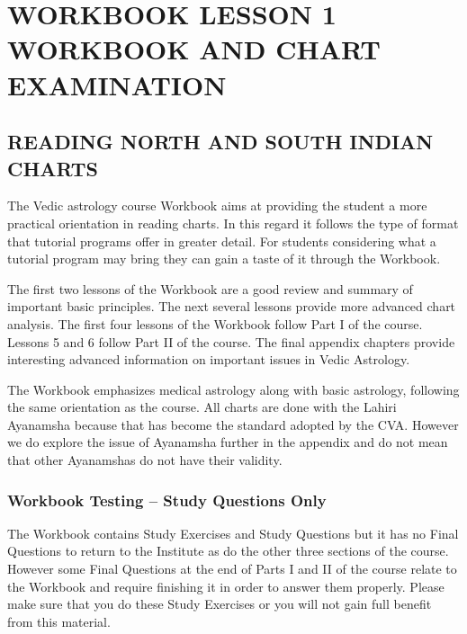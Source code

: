 
\section{WORKBOOK LESSON 1
WORKBOOK AND CHART EXAMINATION}


\subsection{READING NORTH AND SOUTH INDIAN CHARTS}

 

The Vedic astrology course Workbook aims at providing the student a more practical orientation in reading charts. In this regard it follows the type of format that tutorial programs offer in greater detail. For students considering what a tutorial program may bring they can gain a taste of it through the Workbook.

 

The first two lessons of the Workbook are a good review and summary of important basic principles. The next several lessons provide more advanced chart analysis. The first four lessons of the Workbook follow Part I of the course. Lessons 5 and 6 follow Part II of the course. The final appendix chapters provide interesting advanced information on important issues in Vedic Astrology.

 

The Workbook emphasizes medical astrology along with basic astrology, following the same orientation as the course. All charts are done with the Lahiri Ayanamsha because that has become the standard adopted by the CVA. However we do explore the issue of Ayanamsha further in the appendix and do not mean that other Ayanamshas do not have their validity.

 

\subsubsection{Workbook Testing – Study Questions Only}
 

The Workbook contains Study Exercises and Study Questions but it has no Final Questions to return to the Institute as do the other three sections of the course. However some Final Questions at the end of Parts I and II of the course relate to the Workbook and require finishing it in order to answer them properly. Please make sure that you do these Study Exercises or you will not gain full benefit from this material.

 

